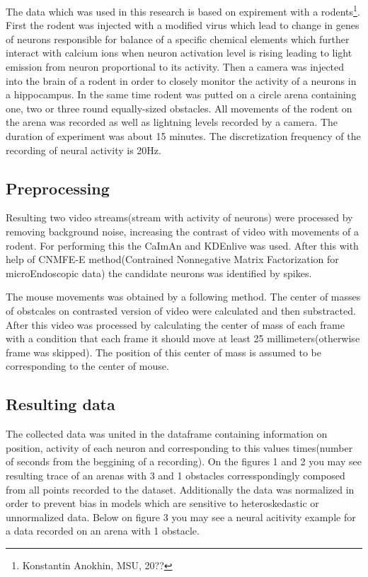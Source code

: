 \documentclass{article}
\begin{document}
	The data which was used in this research is based on expirement with a rodents\footnote{Konstantin Anokhin, MSU, 20??}.
	First the rodent was injected with a modified virus which lead to change in genes of neurons responsible for balance
	of a specific chemical elements which further interact with calcium ions when neuron activation level is rising
	leading to light emission from neuron proportional to its activity. Then a camera was injected
	into the brain of a rodent in order to closely monitor the activity of a neurons in a hippocampus. In the same time
	rodent was putted on a circle arena containing one, two or three round equally-sized obstacles. All movements of the rodent
	on the arena was recorded as well as lightning levels recorded by a camera. The duration of experiment was about 15 minutes.
	The discretization frequency of the recording of neural activity is 20Hz.
	\subsection{Preprocessing}\label{subsec:preprocessing}

	Resulting two video streams(stream with activity of neurons) were processed by removing background noise, increasing
	the contrast of video with movements of a rodent. For performing this the CaImAn and KDEnlive was used. After this
	with help of CNMFE-E method(Contrained Nonnegative Matrix Factorization for microEndoscopic data) the candidate neurons
	was identified by spikes.

	The mouse movements was obtained by a following method. The center of masses of obstcales on contrasted version of video
	were calculated and then substracted. After this video was processed by calculating the center of mass of each frame
	with a condition that each frame it should move at least 25 millimeters(otherwise frame was skipped). The position
	of this center of mass is assumed to be corresponding to the center of mouse.
	\subsection{Resulting data}\label{subsec:resulting-data}

	The collected data was united in the dataframe containing information on position, activity of each neuron and corresponding
	to this values times(number of seconds from the beggining of a recording). On the figures 1 and 2 you may see resulting
	trace of an arenas with 3 and 1 obstacles corresspondingly composed from all points recorded to the dataset.
	Additionally the data was normalized in order to prevent bias in models which are sensitive to heteroskedastic or
	unnormalized data. Below on figure 3 you may see a neural acitivity example for a data recorded on an arena with
	1 obstacle.
\end{document}
